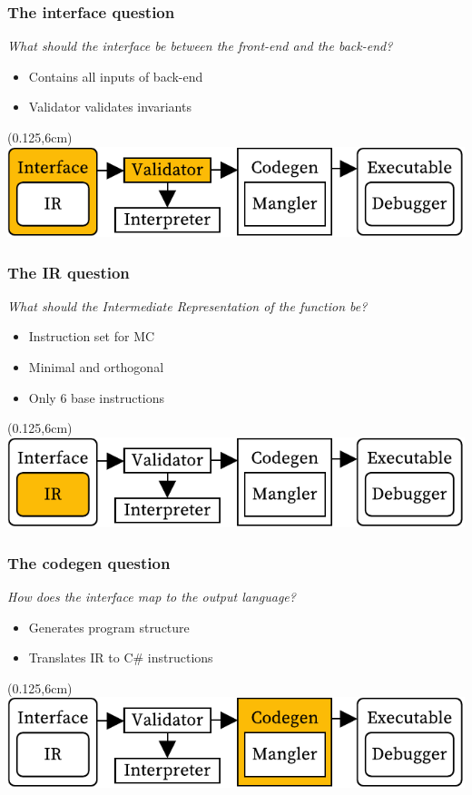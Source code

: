 \documentclass[xetex,serif]{beamer}
\begin{document}
\begin{frame}[t]
\end{frame}\begin{frame}[t]\frametitle{The interface question}
\textit{What should the interface be between the front-end and the back-end?}
\begin{itemize}
    \item Contains all inputs of back-end 
    \item Validator validates invariants
\end{itemize}
\begin{textblock*}{0.75\paperwidth}(0.125\paperwidth,6cm)\includegraphics[width=0.75\paperwidth]{overview_interface}\end{textblock*}

\end{frame}\begin{frame}[t]\frametitle{The IR question}
\textit{What should the Intermediate Representation of the function be?}
\begin{itemize}
    \item Instruction set for MC
    \item Minimal and orthogonal
    \item Only 6 base instructions
\end{itemize}
\begin{textblock*}{0.75\paperwidth}(0.125\paperwidth,6cm)\includegraphics[width=0.75\paperwidth]{overview_ir}\end{textblock*}

\end{frame}\begin{frame}[t]\frametitle{The codegen question}
\textit{How does the interface map to the output language?}
\begin{itemize}
    \item Generates program structure
    \item Translates IR to C\# instructions
\end{itemize}
\begin{textblock*}{0.75\paperwidth}(0.125\paperwidth,6cm)\includegraphics[width=0.75\paperwidth]{overview_codegen}\end{textblock*}


\end{frame}
\end{document}
